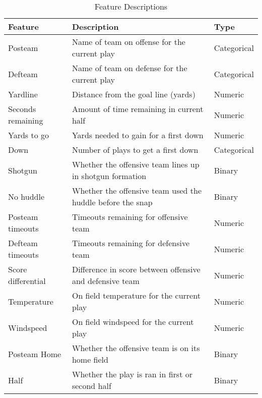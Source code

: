 \documentclass[11pt]{article}
\begin{document}
        
            \begin{table*}[ht]
            \caption{Feature Descriptions} \label{tab:title} 
            \centering
            \begin{tabular}{|| m{4cm} | m{10cm}| m{2cm} ||} 
                \hline
                \textbf{Feature} & \textbf{Description} & \textbf{Type}  \\
                \hline\hline
                Posteam  & Name of team on offense for the current play & Categorical \\
                \hline 
                Defteam & Name of team on defense for the current play & Categorical \\ 
                \hline
                Yardline  & Distance from the goal line (yards) & Numeric \\
                \hline 
                Seconds remaining & Amount of time remaining in current half & Numeric \\
                \hline
                Yards to go & Yards needed to gain for a first down & Numeric \\
                \hline 
                Down & Number of plays to get a first down & Categorical \\
                \hline 
                Shotgun & Whether the offensive team lines up in shotgun formation & Binary \\
                \hline
                No huddle & Whether the offensive team used the huddle before the snap & Binary \\
                \hline 
                Posteam timeouts & Timeouts remaining for offensive team & Numeric \\
                \hline
                Defteam timeouts & Timeouts remaining for defensive team & Numeric \\
                \hline 
                Score differential & Difference in score between offensive and defensive team & Numeric \\
                \hline
                Temperature & On field temperature for the current play & Numeric \\
                \hline 
                Windspeed & On field windspeed for the current play & Numeric \\
                \hline 
                Posteam Home & Whether the offensive team is on its home field & Binary \\
                \hline 
                Half & Whether the play is ran in first or second half & Binary \\

\end{tabular}
\end{table*}
\end{document}
